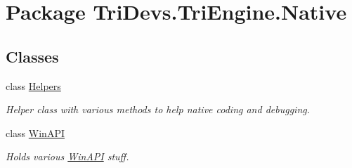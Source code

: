 \hypertarget{namespace_tri_devs_1_1_tri_engine_1_1_native}{\section{Package Tri\-Devs.\-Tri\-Engine.\-Native}
\label{namespace_tri_devs_1_1_tri_engine_1_1_native}
}
\subsection*{Classes}
\begin{DoxyCompactItemize}
\item 
class \hyperlink{class_tri_devs_1_1_tri_engine_1_1_native_1_1_helpers}{Helpers}
\begin{DoxyCompactList}\small\item\em Helper class with various methods to help native coding and debugging. \end{DoxyCompactList}\item 
class \hyperlink{class_tri_devs_1_1_tri_engine_1_1_native_1_1_win_a_p_i}{Win\-A\-P\-I}
\begin{DoxyCompactList}\small\item\em Holds various \hyperlink{class_tri_devs_1_1_tri_engine_1_1_native_1_1_win_a_p_i}{Win\-A\-P\-I} stuff. \end{DoxyCompactList}\end{DoxyCompactItemize}
